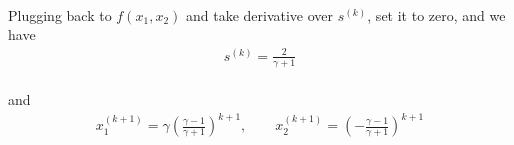 \paragraph{}
Plugging back to $f(x_1, x_2)$ and take derivative over $s^{(k)}$, set it to zero, and we have
\begin{align*}
s^{(k)} = \frac{2}{\gamma +1}
\end{align*}
\paragraph{}
and 
\begin{align*}
x_1^{(k+1)} = \gamma (\frac{\gamma -1}{\gamma +1})^{k+1}, \qquad x_2^{(k+1)} =(-\frac{\gamma -1}{\gamma +1})^{k+1}
\end{align*}
